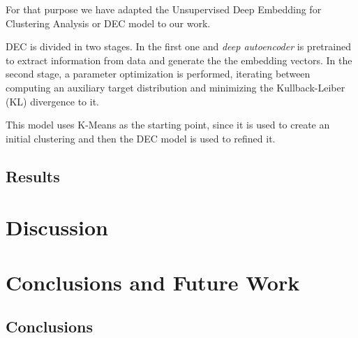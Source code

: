 \documentclass[11pt, a4paper, english]{book}
\begin{document}
For that purpose we have adapted the Unsupervised Deep Embedding for Clustering Analysis or DEC model \cite{xie2016unsupervised} to our work.

DEC is divided in two stages. In the first one and \emph{deep autoencoder} is pretrained to extract information from data and generate the
the embedding vectors. In the second stage, a parameter optimization is performed, iterating between computing an auxiliary target distribution
and minimizing the Kullback-Leiber (KL) divergence \cite{kullback1951information} to it.

This model uses K-Means as the starting point, since it is used to create an initial clustering and then the DEC model is used to refined it.

\section{Results}




\chapter{Discussion}


\chapter{Conclusions and Future Work}

\section{Conclusions}

\end{document}
